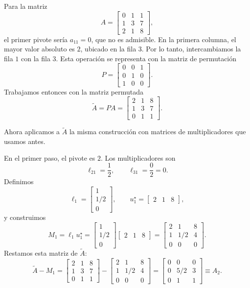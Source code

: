 Para la matriz
\[
A = \begin{bmatrix}
0 & 1 & 1 \\
1 & 3 & 7 \\
2 & 1 & 8
\end{bmatrix},
\]
el primer pivote sería $a_{11}=0$, que no es admisible. En la primera columna, el mayor valor absoluto es $2$, ubicado en la fila $3$. Por lo tanto, intercambiamos la fila $1$ con la fila $3$. Esta operación se representa con la matriz de permutación
\[
P = \begin{bmatrix}
0 & 0 & 1 \\
0 & 1 & 0 \\
1 & 0 & 0
\end{bmatrix}.
\]
Trabajamos entonces con la matriz permutada
\[
\widetilde{A} = PA =
\begin{bmatrix}
2 & 1 & 8 \\
1 & 3 & 7 \\
0 & 1 & 1
\end{bmatrix}.
\]

Ahora aplicamos a $\widetilde{A}$ la misma construcción con matrices de multiplicadores que usamos antes.

En el primer paso, el pivote es $2$. Los multiplicadores son
\[
\ell_{21} = \frac{1}{2}, \qquad \ell_{31} = \frac{0}{2} = 0.
\]
Definimos
\[
\ell_1 = \begin{bmatrix} 1 \\ 1/2 \\ 0 \end{bmatrix}, \qquad
u_1^\star = \begin{bmatrix} 2 & 1 & 8 \end{bmatrix},
\]
y construimos
\[
M_1 = \ell_1 u_1^\star =
\begin{bmatrix}
1 \\ 1/2 \\ 0
\end{bmatrix}
\begin{bmatrix}
2 & 1 & 8
\end{bmatrix}
=
\begin{bmatrix}
2 & 1 & 8 \\
1 & 1/2 & 4 \\
0 & 0 & 0
\end{bmatrix}.
\]
Restamos esta matriz de $\widetilde{A}$:
\[
\widetilde{A} - M_1 =
\begin{bmatrix}
2 & 1 & 8 \\
1 & 3 & 7 \\
0 & 1 & 1
\end{bmatrix}
-
\begin{bmatrix}
2 & 1 & 8 \\
1 & 1/2 & 4 \\
0 & 0 & 0
\end{bmatrix}
=
\begin{bmatrix}
0 & 0 & 0 \\
0 & 5/2 & 3 \\
0 & 1 & 1
\end{bmatrix}
\equiv A_2.
\]

